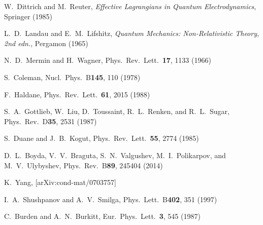 \documentclass[aps,prd,twocolumn,showpacs,superscriptaddress,groupedaddress]{revtex4}  %
\begin{document}
\begin{thebibliography}{99}
W.~Dittrich and M.~Reuter, {\it Effective Lagrangians in Quantum Electrodynamics}, Springer (1985)

L.~D.~Landau and E.~M.~Lifshitz, {\it Quantum Mechanics: Non-Relativistic Theory, 2nd edn.}, Pergamon (1965)

N.~D.~Mermin and H.~Wagner, Phys.\ Rev.\ Lett.\ {\bf 17}, 1133 (1966)

S.~Coleman, Nucl.\ Phys.\ B{\bf 145}, 110 (1978)

F.~Haldane, Phys.\ Rev.\ Lett.\ {\bf  61}, 2015 (1988)

S.~A.~Gottlieb, W.~Liu, D.~Toussaint, R.~L.~Renken, and R.~L.~Sugar, Phys.\ Rev.\ D{\bf 35}, 2531 (1987)

S.~Duane and J.~B.~Kogut, Phys.\ Rev.\ Lett.\ {\bf 55}, 2774 (1985)

D.~L.~Boyda, V.~V.~Braguta, S.~N.~Valgushev, M.~I.~Polikarpov, and M.~V.~Ulybyshev, Phys.\ Rev.\ B{\bf 89}, 245404 (2014)

K.~Yang, [arXiv:cond-mat/0703757]

I.~A.~Shushpanov and A.~V.~Smilga, Phys.\ Lett.\ B{\bf 402}, 351 (1997)

C.~Burden and A.~N.~Burkitt, Eur.\ Phys.\ Lett.\ {\bf 3}, 545 (1987)


\end{thebibliography}
\end{document}
